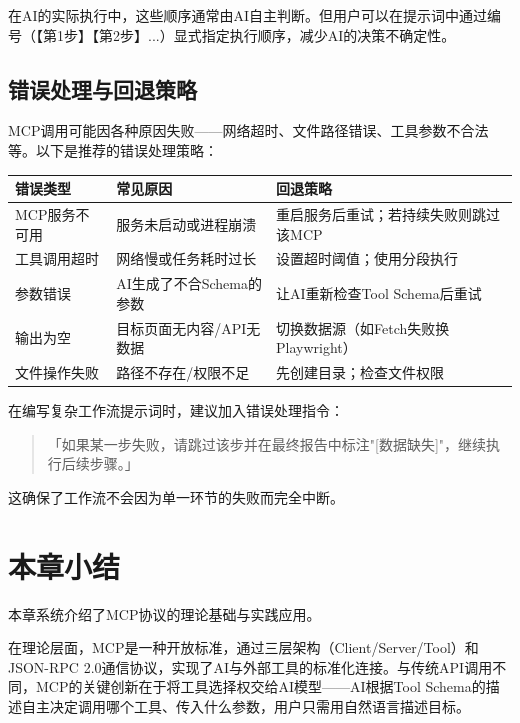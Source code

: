 在AI的实际执行中，这些顺序通常由AI自主判断。但用户可以在提示词中通过编号（【第1步】【第2步】...）显式指定执行顺序，减少AI的决策不确定性。

\subsection{错误处理与回退策略}

MCP调用可能因各种原因失败——网络超时、文件路径错误、工具参数不合法等。以下是推荐的错误处理策略：

\begin{table}[H]
\centering
\begin{tabular}{lp{5cm}p{5cm}}
\toprule
\textbf{错误类型} & \textbf{常见原因} & \textbf{回退策略} \\
\midrule
MCP服务不可用 & 服务未启动或进程崩溃 & 重启服务后重试；若持续失败则跳过该MCP \\
工具调用超时 & 网络慢或任务耗时过长 & 设置超时阈值；使用分段执行 \\
参数错误 & AI生成了不合Schema的参数 & 让AI重新检查Tool Schema后重试 \\
输出为空 & 目标页面无内容/API无数据 & 切换数据源（如Fetch失败换Playwright） \\
文件操作失败 & 路径不存在/权限不足 & 先创建目录；检查文件权限 \\
\bottomrule
\end{tabular}
\end{table}

\begin{notebox}[提示词中的错误处理技巧]
在编写复杂工作流提示词时，建议加入错误处理指令：
\begin{quote}
「如果某一步失败，请跳过该步并在最终报告中标注"[数据缺失]"，继续执行后续步骤。」
\end{quote}
这确保了工作流不会因为单一环节的失败而完全中断。
\end{notebox}


\section*{本章小结}

本章系统介绍了MCP协议的理论基础与实践应用。

在理论层面，MCP是一种开放标准，通过三层架构（Client/Server/Tool）和JSON-RPC 2.0通信协议，实现了AI与外部工具的标准化连接。与传统API调用不同，MCP的关键创新在于将工具选择权交给AI模型——AI根据Tool Schema的描述自主决定调用哪个工具、传入什么参数，用户只需用自然语言描述目标。


